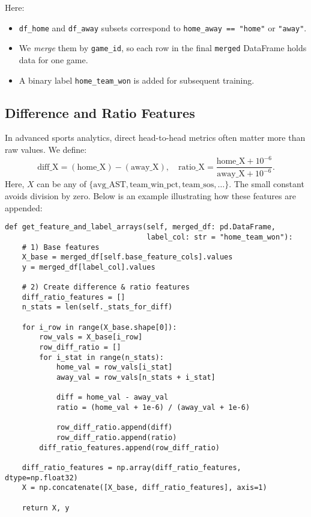 \documentclass[12pt]{article}
\begin{document}
\noindent
Here:
\begin{itemize}
    \item \texttt{df\_home} and \texttt{df\_away} subsets correspond to \texttt{home\_away == "home"} or \texttt{"away"}.
    \item We \emph{merge} them by \texttt{game\_id}, so each row in the final \texttt{merged} DataFrame holds data for one game.
    \item A binary label \texttt{home\_team\_won} is added for subsequent training.
\end{itemize}

\subsection{Difference and Ratio Features}
In advanced sports analytics, direct head-to-head metrics often matter more than raw values. We define:
\[
\text{diff\_X} = (\text{home\_X}) - (\text{away\_X}), 
\quad 
\text{ratio\_X} = \frac{\text{home\_X} + 10^{-6}}{\text{away\_X} + 10^{-6}}.
\]
Here, \(X\) can be any of \(\{ \text{avg\_AST}, \text{team\_win\_pct}, \text{team\_sos}, \ldots \}\). The small constant avoids division by zero. Below is an example illustrating how these features are appended:

\begin{verbatim}
def get_feature_and_label_arrays(self, merged_df: pd.DataFrame, 
                                 label_col: str = "home_team_won"):
    # 1) Base features
    X_base = merged_df[self.base_feature_cols].values
    y = merged_df[label_col].values

    # 2) Create difference & ratio features
    diff_ratio_features = []
    n_stats = len(self._stats_for_diff)

    for i_row in range(X_base.shape[0]):
        row_vals = X_base[i_row]
        row_diff_ratio = []
        for i_stat in range(n_stats):
            home_val = row_vals[i_stat]
            away_val = row_vals[n_stats + i_stat]

            diff = home_val - away_val
            ratio = (home_val + 1e-6) / (away_val + 1e-6)

            row_diff_ratio.append(diff)
            row_diff_ratio.append(ratio)
        diff_ratio_features.append(row_diff_ratio)

    diff_ratio_features = np.array(diff_ratio_features, dtype=np.float32)
    X = np.concatenate([X_base, diff_ratio_features], axis=1)

    return X, y
\end{verbatim}
\end{document}
